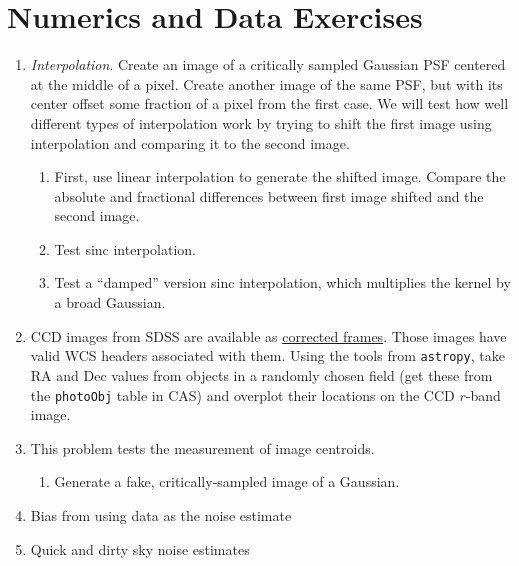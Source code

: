 \section{Numerics and Data Exercises}

\begin{enumerate}
\item {\it Interpolation}. Create an image of a critically sampled
    Gaussian PSF centered at the middle of a pixel. Create another
    image of the same PSF, but with its center offset some fraction of
    a pixel from the first case. We will test how well different types
    of interpolation work by trying to shift the first image using
    interpolation and comparing it to the second image.
\begin{enumerate}
\item First, use linear interpolation to generate the shifted
    image. Compare the absolute and fractional differences between
    first image shifted and the second image.
\item
    Test sinc interpolation.  \item Test a ``damped'' version sinc
    interpolation, which multiplies the kernel by a broad
    Gaussian.
\end{enumerate}
\item CCD images from SDSS are available
as \href{https://www.sdss.org/dr14/imaging/images/#corr}{corrected
frames}. Those images have valid WCS headers associated with
them. Using the tools from {\tt astropy}, take RA and Dec values from
objects in a randomly chosen field (get these from the {\tt photoObj}
table in CAS) and overplot their locations on the CCD $r$-band image.
\item This problem tests the measurement of image centroids.
\begin{enumerate}
\item Generate a fake, critically-sampled image of a Gaussian. 
\end{enumerate}
\item Bias from using data as the noise estimate
\item Quick and dirty sky noise estimates
\end{enumerate}


  
